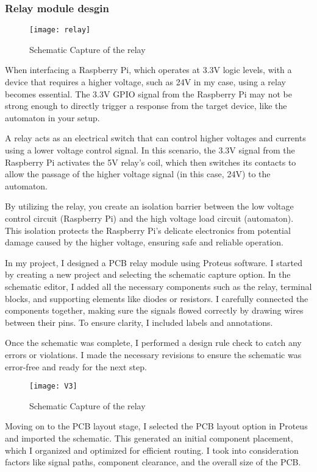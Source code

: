 \subsubsection{Relay module desgin}

\FloatBarrier
\begin{figure}[h]
\FloatBarrier
         \centering
        \texttt{[image: relay]}
   
        \caption{Schematic Capture of the relay}
        \label{Schematic Capture of the relay}
\FloatBarrier
    \end{figure}
\FloatBarrier
When interfacing a Raspberry Pi, which operates at 3.3V logic levels, with a device that requires a higher voltage, such as 24V in my case, using a relay becomes essential. The 3.3V GPIO signal from the Raspberry Pi may not be strong enough to directly trigger a response from the target device, like the automaton in your setup.

A relay acts as an electrical switch that can control higher voltages and currents using a lower voltage control signal. In this scenario, the 3.3V signal from the Raspberry Pi activates the 5V relay's coil, which then switches its contacts to allow the passage of the higher voltage signal (in this case, 24V) to the automaton.

By utilizing the relay, you create an isolation barrier between the low voltage control circuit (Raspberry Pi) and the high voltage load circuit (automaton). This isolation protects the Raspberry Pi's delicate electronics from potential damage caused by the higher voltage, ensuring safe and reliable operation.


In my project, I designed a PCB relay module using Proteus software. I started by creating a new project and selecting the schematic capture option. In the schematic editor, I added all the necessary components such as the relay, terminal blocks, and supporting elements like diodes or resistors. I carefully connected the components together, making sure the signals flowed correctly by drawing wires between their pins. To ensure clarity, I included labels and annotations.

Once the schematic was complete, I performed a design rule check to catch any errors or violations. I made the necessary revisions to ensure the schematic was error-free and ready for the next step.


\FloatBarrier
\FloatBarrier
\begin{figure}[h]
\FloatBarrier
         \centering
        \texttt{[image: V3]}
   
        \caption{Schematic Capture of the relay}
        \label{Schematic Capture of the relay}
\FloatBarrier
    \end{figure}
\FloatBarrier
Moving on to the PCB layout stage, I selected the PCB layout option in Proteus and imported the schematic. This generated an initial component placement, which I organized and optimized for efficient routing. I took into consideration factors like signal paths, component clearance, and the overall size of the PCB.

